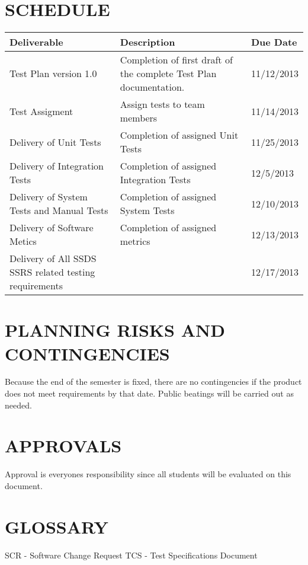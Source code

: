 \documentclass[report]{article}
\begin{document}
\section[SCHEDULE]{SCHEDULE}
\begin{center}
\begin{tabularx}{\textwidth}{| X | X | X |}
  \hline
  \textbf{Deliverable} &
  \textbf{Description} &
  \textbf{Due Date} 
\\ \hline
Test Plan version 1.0 & 
Completion of first draft of the complete Test Plan documentation. &
11/12/2013
\\ \hline

Test Assigment &
Assign tests to team members &
11/14/2013
\\ \hline

Delivery of Unit Tests &
Completion of assigned Unit Tests &
11/25/2013
\\ \hline

Delivery of Integration Tests &
Completion of assigned Integration Tests &
12/5/2013
\\ \hline

Delivery of System Tests and Manual Tests &
Completion of assigned System Tests &
12/10/2013
\\ \hline

Delivery of Software Metics &
Completion of assigned metrics &
12/13/2013
\\ \hline

Delivery of All SSDS SSRS related testing requirements & &
12/17/2013

\end{tabularx}
\end{center}

\section[PLANNING RISKS AND CONTINGENCIES]{PLANNING RISKS AND CONTINGENCIES}
Because the end of the semester is fixed, there are no contingencies if the product does not meet requirements by that date. Public beatings will be carried out as needed.

\section[APPROVALS]{APPROVALS}

Approval is everyones responsibility since all students will be evaluated on this document.

\section[GLOSSARY]{GLOSSARY}
SCR - Software Change Request
TCS - Test Specifications Document
\end{document}
